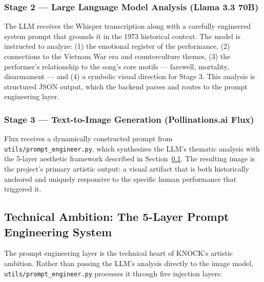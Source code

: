 \documentclass[12pt, a4paper]{article}
\begin{document}
\subsubsection{Stage 2 --- Large Language Model Analysis (Llama 3.3 70B)}

The LLM receives the Whisper transcription along with a carefully engineered system
prompt that grounds it in the 1973 historical context. The model is instructed to
analyze: (1) the emotional register of the performance, (2) connections to the
Vietnam War era and counterculture themes, (3) the performer's relationship to the
song's core motifs --- farewell, mortality, disarmament --- and (4) a symbolic visual
direction for Stage 3. This analysis is structured JSON output, which the backend
parses and routes to the prompt engineering layer.

\subsubsection{Stage 3 --- Text-to-Image Generation (Pollinations.ai Flux)}

Flux receives a dynamically constructed prompt from \texttt{utils/prompt\_engineer.py},
which synthesizes the LLM's thematic analysis with the 5-layer aesthetic framework
described in Section~\ref{sec:prompt}. The resulting image is the project's primary
artistic output: a visual artifact that is both historically anchored and uniquely
responsive to the specific human performance that triggered it.

\subsection{Technical Ambition: The 5-Layer Prompt Engineering System}
\label{sec:prompt}

The prompt engineering layer is the technical heart of KNOCK's artistic ambition.
Rather than passing the LLM's analysis directly to the image model,
\texttt{utils/prompt\_engineer.py} processes it through five injection layers:
\end{document}
